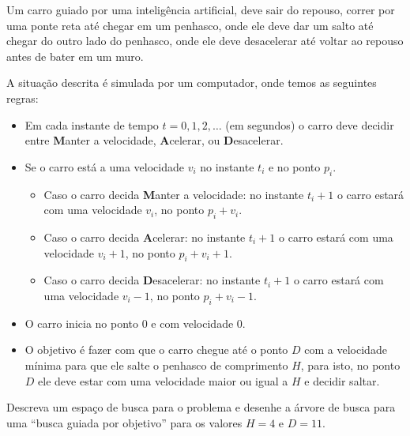\documentclass[12pt]{exam}
\begin{document}
\begin{questions}



\question Um carro guiado por uma inteligência artificial, deve sair do repouso, correr por uma ponte reta até chegar em um penhasco, onde ele deve dar um salto até chegar do outro lado do penhasco, onde ele deve desacelerar até voltar ao repouso antes de bater em um muro. 

A situação descrita é simulada por um computador, onde temos as seguintes regras:

\begin{itemize}

\item Em cada instante de tempo $t = 0, 1, 2, \dots$ (em segundos) o carro deve decidir entre \textbf{M}anter a velocidade, \textbf{A}celerar, ou \textbf{D}esacelerar. 

\item Se o carro está a uma velocidade $v_i$ no instante $t_i$ e no ponto $p_i$. 

\begin{itemize}

\item Caso o carro decida \textbf{M}anter a velocidade: no instante $t_i+1$ o carro estará com uma velocidade $v_i$, no ponto $p_i+v_i$. 

\item Caso o carro decida \textbf{A}celerar: no instante $t_i+1$ o carro estará com uma velocidade $v_i+1$, no ponto $p_i+v_i+1$. 

\item Caso o carro decida \textbf{D}esacelerar: no instante $t_i+1$ o carro estará com uma velocidade $v_i-1$, no ponto $p_i+v_i-1$. 

\end{itemize}

\item O carro inicia no ponto $0$ e com velocidade $0$. 

\item O objetivo é fazer com que o carro chegue até o ponto $D$ com a velocidade mínima para que ele salte o penhasco de comprimento $H$, para isto, no ponto $D$ ele deve estar com uma velocidade maior ou igual a $H$ e decidir saltar.

\end{itemize}

Descreva um espaço de busca para o problema e desenhe a árvore de  busca para uma ``busca guiada por objetivo'' para os valores $H = 4$ e $D = 11$. 


\end{questions}
\end{document}
